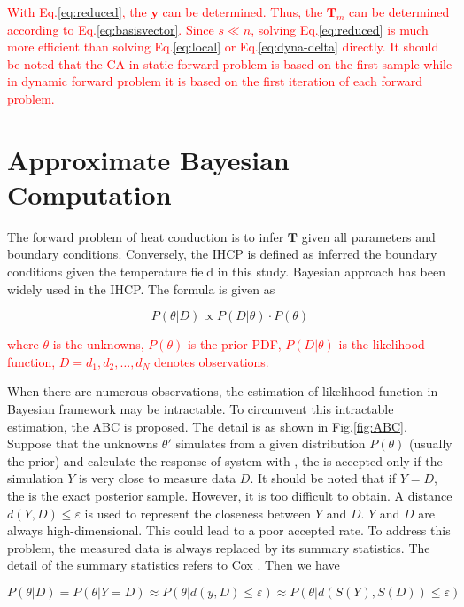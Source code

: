 \documentclass[review]{elsarticle}
\begin{document}
\textcolor{red}{With Eq.\ref{eq:reduced}, the $\mathbf{y}$ can be determined. Thus, the $\mathbf{T}_m$ can be determined according to Eq.\ref{eq:basisvector}. Since $ s\ll n$, solving Eq.\ref{eq:reduced} is much more efficient than solving Eq.\ref{eq:local} or Eq.\ref{eq:dyna-delta} directly. It should be noted that the CA in static forward problem is based on the first sample while in dynamic forward problem it is based on the first iteration of each forward problem.}

\section{Approximate Bayesian Computation}
The forward problem of heat conduction is to infer $\mathbf{T}$ given all parameters and boundary conditions. Conversely, the IHCP is defined as inferred the boundary conditions given the temperature field in this study. Bayesian approach has been widely used in the IHCP. The formula is given as

\begin{equation}
    P(\theta | D) \propto P(D|\theta) \cdot P(\theta)
    \label{eq:Bayesian}
\end{equation}

\noindent \textcolor{red}{where $\theta$ is the unknowns, $P(\theta)$ is the prior PDF, $P(D|\theta)$ is the likelihood function, $D = {d_1,d_2,\dots,d_N}$ denotes observations.}

When there are numerous observations, the estimation of likelihood function in Bayesian framework may be intractable. To circumvent this intractable estimation, the ABC is proposed. The detail is as shown in Fig.\ref{fig:ABC}. Suppose that the unknowns $\theta'$ simulates from a given distribution $P(\theta)$ (usually the prior) and calculate the response of system with , the is accepted only if the simulation $Y$ is very close to measure data $D$. It should be noted that if  $Y=D$, the is the exact posterior sample. However, it is too difficult to obtain. A distance $d(Y,D)\leq \varepsilon$ is used to represent the closeness between $Y$ and $D$. $Y$ and $D$ are always high-dimensional. This could lead to a poor accepted rate. To address this problem, the measured data is always replaced by its summary statistics\cite{joyce2008approximately,fearnhead2012constructing}. The detail of the summary statistics refers to Cox \cite{cox2006principles}. Then we have

\begin{equation}
    P(\theta|D) = P(\theta|Y=D)\approx P(\theta|d(y,D)\leq \varepsilon) \approx P(\theta|d(S(Y),S(D))\leq \varepsilon)
    \label{eq:ABC}
\end{equation}
\end{document}
